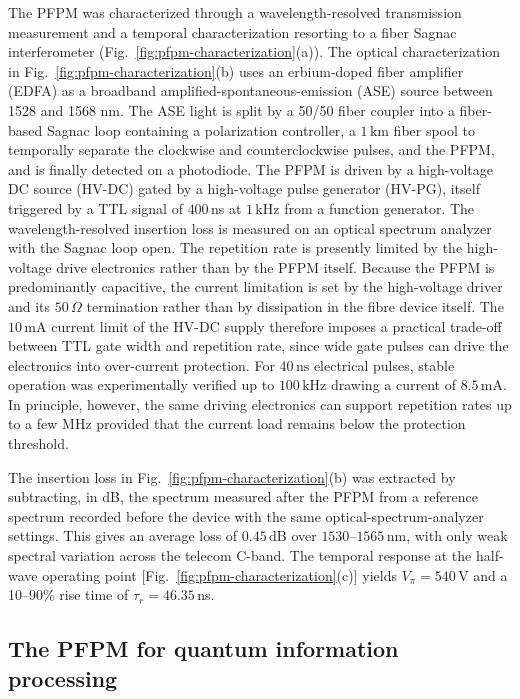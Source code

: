 \documentclass[pra,aps,reprint,nofootinbib,superscriptaddress,floatfix]{revtex4-2}
\begin{document}
The PFPM was characterized through a wavelength-resolved transmission measurement and a temporal characterization resorting to a fiber Sagnac interferometer (Fig.~\ref{fig:pfpm-characterization}(a)). The optical characterization in Fig.~\ref{fig:pfpm-characterization}(b) uses an erbium-doped fiber amplifier (EDFA) as a broadband amplified-spontaneous-emission (ASE) source between 1528 and 1568 nm. The ASE light is split by a 50/50 fiber coupler into a fiber-based Sagnac loop containing a polarization controller, a $1\,$km fiber spool to temporally separate the clockwise and counterclockwise pulses, and the PFPM, and is finally detected on a photodiode. The PFPM is driven by a high-voltage DC source (HV-DC) gated by a high-voltage pulse generator (HV-PG), itself triggered by a TTL signal of $400\,$ns at $1\,$kHz from a function generator. The wavelength-resolved insertion loss is measured on an optical spectrum analyzer with the Sagnac loop open. The repetition rate is presently limited by the high-voltage drive electronics rather than by the PFPM itself. Because the PFPM is predominantly capacitive, the current limitation is set by the high-voltage driver and its $50\,\Omega$ termination rather than by dissipation in the fibre device itself. The $10\,\mathrm{mA}$ current limit of the HV-DC supply therefore imposes a practical trade-off between TTL gate width and repetition rate, since wide gate pulses can drive the electronics into over-current protection. For $40\,\mathrm{ns}$ electrical pulses, stable operation was experimentally verified up to $100\,\mathrm{kHz}$ drawing a current of $8.5\, \mathrm{mA}$. In principle, however, the same driving electronics can support repetition rates up to a few $\mathrm{MHz}$ provided that the current load remains below the protection threshold.

The insertion loss in Fig.~\ref{fig:pfpm-characterization}(b) was extracted by subtracting, in dB, the spectrum measured after the PFPM from a reference spectrum recorded before the device with the same optical-spectrum-analyzer settings. This gives an average loss of $0.45\,$dB over $1530$--$1565\,$nm, with only weak spectral variation across the telecom C-band. The temporal response at the half-wave operating point [Fig.~\ref{fig:pfpm-characterization}(c)] yields $V_\pi = 540\,$V and a 10--90\% rise time of $\tau_r = 46.35\,$ns.

\subsection*{The PFPM for quantum information processing}
\label{sec:setup}
\end{document}
